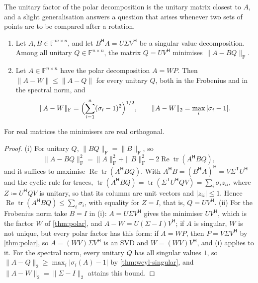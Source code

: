 The unitary factor of the polar decomposition is the unitary matrix closest to $A$, and a slight generalisation answers a question that arises whenever two sets of points are to be compared after a rotation.

\begin{theorem}
\label{thm:procrustes}
\leavevmode
\begin{enumerate}
\item Let $A,B\in\mathbb F^{m\times n}$, and let $B^{\mathsf H}A=U\Sigma V^{\mathsf H}$ be a singular value decomposition. Among all unitary $Q\in\mathbb F^{n\times n}$, the matrix $Q=UV^{\mathsf H}$ minimises $\|A-BQ\|_{\mathrm F}$.
\item Let $A\in\mathbb F^{n\times n}$ have the polar decomposition $A=WP$. Then $\|A-W\|\le\|A-Q\|$ for every unitary $Q$, both in the Frobenius and in the spectral norm, and
\[
\|A-W\|_{\mathrm F}=\Bigl(\sum_{i=1}^n(\sigma_i-1)^2\Bigr)^{1/2},\qquad\|A-W\|_2=\max_i|\sigma_i-1| .
\]
\end{enumerate}
For real matrices the minimisers are real orthogonal.
\end{theorem}

\begin{proof}
(i) For unitary $Q$, $\|BQ\|_{\mathrm F}=\|B\|_{\mathrm F}$, so
\[
\|A-BQ\|_{\mathrm F}^2=\|A\|_{\mathrm F}^2+\|B\|_{\mathrm F}^2-2\operatorname{Re}\operatorname{tr}(A^{\mathsf H}BQ),
\]
and it suffices to maximise $\operatorname{Re}\operatorname{tr}(A^{\mathsf H}BQ)$. With $A^{\mathsf H}B=(B^{\mathsf H}A)^{\mathsf H}=V\Sigma^{\mathsf T}U^{\mathsf H}$ and the cyclic rule for traces, $\operatorname{tr}(A^{\mathsf H}BQ)=\operatorname{tr}(\Sigma^{\mathsf T}U^{\mathsf H}QV)=\sum_i\sigma_iz_{ii}$, where $Z\coloneqq U^{\mathsf H}QV$ is unitary, so that its columns are unit vectors and $|z_{ii}|\le1$. Hence $\operatorname{Re}\operatorname{tr}(A^{\mathsf H}BQ)\le\sum_i\sigma_i$, with equality for $Z=I$, that is, $Q=UV^{\mathsf H}$. (ii) For the Frobenius norm take $B=I$ in (i): $A=U\Sigma V^{\mathsf H}$ gives the minimiser $UV^{\mathsf H}$, which is the factor $W$ of \cref{thm:polar}, and $A-W=U(\Sigma-I)V^{\mathsf H}$; if $A$ is singular, $W$ is not unique, but every polar factor has this form: if $A=WP$, then $P=V\Sigma V^{\mathsf H}$ by \cref{thm:polar}, so $A=(WV)\Sigma V^{\mathsf H}$ is an SVD and $W=(WV)V^{\mathsf H}$, and (i) applies to it. For the spectral norm, every unitary $Q$ has all singular values $1$, so $\|A-Q\|_2\ge\max_i|\sigma_i(A)-1|$ by \cref{thm:weyl-singular}, and $\|A-W\|_2=\|\Sigma-I\|_2$ attains this bound.
\end{proof}

